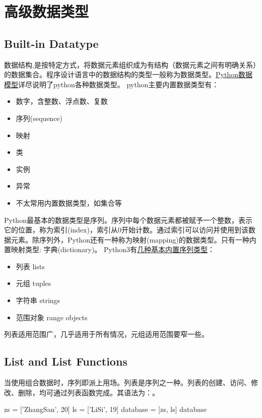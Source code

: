 \chapter{高级数据类型}
\section{Built-in Datatype}
数据结构,是按特定方式，将数据元素组织成为有结构（数据元素之间有明确关系）的数据集合。程序设计语言中的数据结构的类型一般称为数据类型。\href{https://docs.python.org/3/reference/datamodel.html}{Python数据模型}详尽说明了python各种数据类型。
python主要内置数据类型有：
\begin{itemize}
\item 数字，含整数、浮点数、复数
\item 序列(sequence)
\item 映射
\item 类
\item 实例
\item 异常
\item 不太常用内置数据类型，如集合等
\end{itemize}
Python最基本的数据类型是序列。序列中每个数据元素都被赋予一个整数，表示它的位置，称为索引(index)，索引从0开始计数。通过索引可以访问并使用到该数据元素。除序列外，Python还有一种称为映射(mapping)的数据类型。只有一种内置映射类型: 字典(dictionary)。
Python3有\href{https://docs.python.org/3/library/stdtypes.html#sequence-types-list-tuple-range}{几种基本内置序列类型}：
\begin{itemize}
\item 列表 lists
\item 元组 tuples
\item 字符串 strings
\item 范围对象 range objects
\end{itemize}
列表适用范围广，几乎适用于所有情况，元组适用范围要窄一些。
\
\section{List and List Functions}
当使用组合数据时，序列即派上用场。列表是序列之一种。列表的创建、访问、修改、删除，均可通过列表函数完成。其语法为：。
\begin{python}
zs = ['ZhangSan', 20]
ls = ['LiSi', 19]
database = [zs, ls]
database
\end{python}
